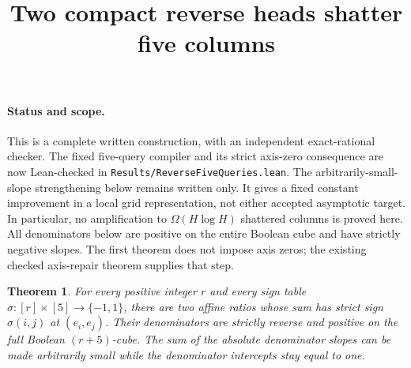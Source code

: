 \documentclass[11pt]{article}
\title{Two compact reverse heads shatter five columns}
\author{}
\date{}
\newtheorem{theorem}{Theorem}
\begin{document}
\maketitle

\paragraph{Status and scope.}
This is a complete written construction, with an independent exact-rational
checker. The fixed five-query compiler and its strict axis-zero consequence
are now Lean-checked in \texttt{Results/ReverseFiveQueries.lean}. The
arbitrarily-small-slope strengthening below remains written only. It gives a fixed constant improvement in a
local grid representation, not either accepted asymptotic target. In
particular, no amplification to $\Omega(H\log H)$ shattered columns is
proved here. All denominators below are positive on the entire Boolean
cube and have strictly negative slopes. The first theorem does not impose
axis zeros; the existing checked axis-repair theorem supplies that step.

\begin{theorem}
For every positive integer $r$ and every sign table
$\sigma:[r]\times[5]\to\{-1,1\}$, there are two affine ratios
whose sum has strict sign $\sigma(i,j)$ at $(e_i,e_j)$. Their denominators
are strictly reverse and positive on the full Boolean $(r+5)$-cube.
The sum of the absolute denominator slopes can be made arbitrarily
small while the denominator intercepts stay equal to one.
\end{theorem}
\end{document}

